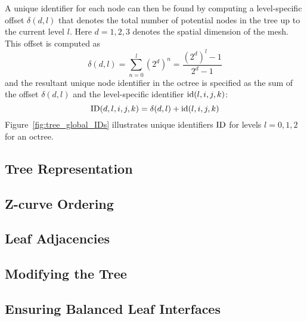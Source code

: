 

A unique identifier for each node can then be found by computing a
level-specific offset $\delta(d,l)$ that denotes the total number of potential
nodes in the tree up to the current level $l$. Here $d=1,2,3$ denotes the
spatial dimension of the mesh. This offset is computed as
%
\begin{equation}
\delta(d,l) = \sum_{n=0}^l (2^d)^n = \frac{(2^d)^l - 1}{2^d - 1}
\end{equation}
%
and the resultant unique node identifier in the octree is specified as the
sum of the offset $\delta(d,l)$ and the level-specific identifier
$\text{id}(l,i,j,k)$:
%
\begin{equation}
\text{ID}(d,l,i,j,k) = \delta(d,l) + \text{id}(l,i,j,k)
\end{equation}
%
Figure~\ref{fig:tree_global_IDs} illustrates unique identifiers $\text{ID}$ for
levels $l=0,1,2$ for an octree.

\subsection{Tree Representation}

\subsection{Z-curve Ordering}

\subsection{Leaf Adjacencies}

\subsection{Modifying the Tree}

\subsection{Ensuring Balanced Leaf Interfaces}

